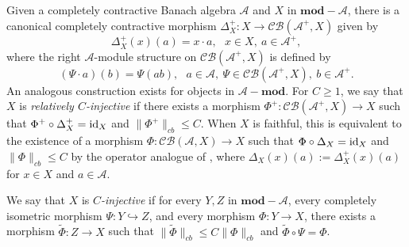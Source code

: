 \documentclass[preprint,12pt]{elsarticle}
\newcommand{\mc}[1]{\mathcal{#1}}
\newcommand{\e}[1]{\emph{#1}}
\newcommand{\id}{\textnormal{id}}
\providecommand{\norm}[1]{\lVert#1\rVert}
\begin{document}



Given a completely contractive Banach algebra $\mc{A}$ and $X$ in $\mathbf{mod}-\mc{A}$, there is a canonical completely contractive morphism $\Delta_X^+:X\rightarrow\mc{CB}(\mc{A}^+,X)$ given by
\begin{equation*}\Delta_X^+(x)(a)=x\cdot a, \ \ \ x\in X, \ a\in\mc{A}^+,\end{equation*}
where the right $\mc{A}$-module structure on $\mc{CB}(\mc{A}^+,X)$ is defined by
\begin{equation*}(\Psi\cdot a)(b)=\Psi(ab), \ \ \ a\in\mc{A}, \ \Psi\in\mc{CB}(\mc{A}^+,X), \ b\in\mc{A}^+.\end{equation*}
An analogous construction exists for objects in $\mc{A}-\mathbf{mod}$. For $C\geq 1$, we say that $X$ is \e{relatively $C$-injective} if there exists a morphism $\Phi^+:\mc{CB}(\mc{A}^+,X)\rightarrow X$ such that $\Phi^+\circ\Delta_X^+=\id_{X}$ and $\norm{\Phi^+}_{cb}\leq C$. When $X$ is faithful, this is equivalent to the existence of a morphism $\Phi:\mc{CB}(\mc{A},X)\rightarrow X$ such that $\Phi\circ\Delta_X=\id_{X}$ and $\norm{\Phi}_{cb}\leq C$ by the operator analogue of \cite[Proposition 1.7]{DP}, where $\Delta_X(x)(a):=\Delta_X^+(x)(a)$ for $x\in X$ and $a\in\mc{A}$.

We say that $X$ is \e{$C$-injective} if for every $Y,Z$ in $\mathbf{mod}-\mc{A}$, every completely isometric morphism $\Psi:Y\hookrightarrow Z$, and every morphism $\Phi:Y\rightarrow X$, there exists a morphism $\widetilde{\Phi}:Z\rightarrow X$ such that $\norm{\widetilde{\Phi}}_{cb}\leq C\norm{\Phi}_{cb}$ and $\widetilde{\Phi}\circ\Psi=\Phi$.
\end{document}
